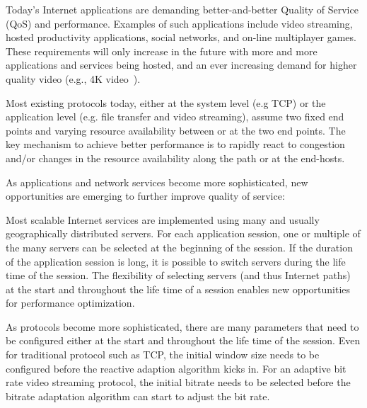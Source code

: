 \label{sec:intro}



Today's Internet applications are demanding better-and-better Quality of Service (QoS) and performance. Examples of such applications include video streaming, hosted productivity applications, social networks, and on-line multiplayer games. These requirements will only increase in the future with more and more applications and services being hosted, and an ever increasing demand for higher quality video (e.g., 4K video~\cite{4kvideo}).

Most existing protocols today, either at the system level (e.g TCP) or the application level (e.g. file transfer and video streaming), assume two fixed end points and varying resource availability between or at the two end points.  The key mechanism to achieve better performance is to rapidly react to congestion and/or changes in the resource availability along the path or at the end-hosts. 

As applications and network services become more sophisticated,  new opportunities are emerging to further improve quality of service: 

  Most scalable Internet services are implemented using many and usually geographically distributed servers.  For each application session, one or multiple of the many servers can be selected at the beginning of the session.  If the duration of the application session is long, it is possible to switch servers during the life time of the session. The flexibility of selecting servers (and thus Internet paths) at the start and throughout the life time of a session enables new opportunities for performance optimization. 

 As protocols become more sophisticated, there are many parameters that need to be configured either at the start and throughout the life time of the session. Even for traditional protocol such as TCP, the initial window size needs to be configured before the reactive adaption algorithm kicks in. For an adaptive bit rate video streaming protocol, the initial bitrate needs to be selected before the bitrate adaptation algorithm can start to adjust the bit rate. 


